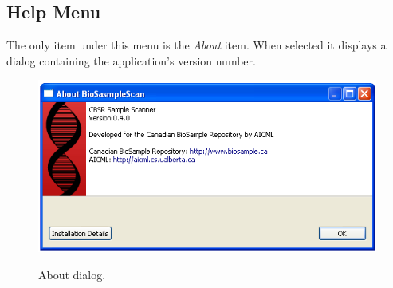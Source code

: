 \subsection{Help Menu}
The only item under this menu is the \emph{About} item. When selected it
displays a dialog containing the application's version number.
\begin{figure}[H]
  \centering
  \scalebox{0.5}
	   { \includegraphics*{screenshots/overview/about_dialog} }
	   \caption{About dialog.}
	   \label{fig:about_dialog}
\end{figure}

